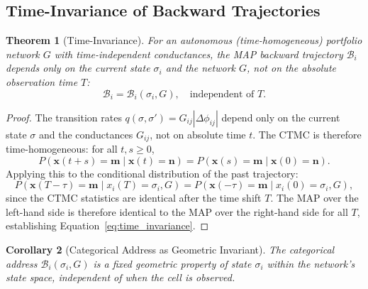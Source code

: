 \documentclass[twocolumn,10pt]{article}
\newtheorem{theorem}{Theorem}[section]
\newtheorem{corollary}[theorem]{Corollary}
\theoremstyle{remark}
\newcommand{\eqnref}[1]{Equation~\ref{#1}}
\begin{document}
\subsection{Time-Invariance of Backward Trajectories}

\begin{theorem}[Time-Invariance]
\label{thm:time_invariance}
For an autonomous (time-homogeneous) portfolio network $G$ with time-independent conductances, the MAP backward trajectory $\mathcal{B}_i$ depends only on the current state $\sigma_i$ and the network $G$, not on the absolute observation time $T$:
\begin{equation}
    \mathcal{B}_i = \mathcal{B}_i(\sigma_i, G), \quad \text{independent of } T.
    \label{eq:time_invariance}
\end{equation}
\end{theorem}

\begin{proof}
The transition rates $q(\sigma, \sigma') = G_{ij} |\Delta\phi_{ij}|$ depend only on the current state $\sigma$ and the conductances $G_{ij}$, not on absolute time $t$.  The CTMC is therefore time-homogeneous: for all $t, s \geq 0$,
\begin{equation}
    P(\mathbf{x}(t+s) = \mathbf{m} \mid \mathbf{x}(t) = \mathbf{n}) = P(\mathbf{x}(s) = \mathbf{m} \mid \mathbf{x}(0) = \mathbf{n}).
\end{equation}
Applying this to the conditional distribution of the past trajectory:
\begin{equation}
    P(\mathbf{x}(T-\tau) = \mathbf{m} \mid x_i(T) = \sigma_i, G) = P(\mathbf{x}(-\tau) = \mathbf{m} \mid x_i(0) = \sigma_i, G),
\end{equation}
since the CTMC statistics are identical after the time shift $T$.  The MAP over the left-hand side is therefore identical to the MAP over the right-hand side for all $T$, establishing \eqnref{eq:time_invariance}.
\end{proof}

\begin{corollary}[Categorical Address as Geometric Invariant]
\label{cor:geometric_invariant}
The categorical address $\mathcal{B}_i(\sigma_i, G)$ is a fixed geometric property of state $\sigma_i$ within the network's state space, independent of when the cell is observed.
\end{corollary}
\end{document}
